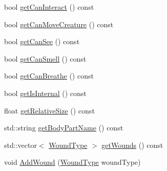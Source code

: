 \begin{DoxyCompactItemize}
\item 
bool \mbox{\hyperlink{class_body_part_a9a53de5a283928eb78986c3195d0f1b9}{get\+Can\+Interact}} () const
\item 
bool \mbox{\hyperlink{class_body_part_a77da57c41bc2b7bde4f35d13298224ca}{get\+Can\+Move\+Creature}} () const
\item 
bool \mbox{\hyperlink{class_body_part_ab1a17aec7b3aa4d388fb9c8421cdc519}{get\+Can\+See}} () const
\item 
bool \mbox{\hyperlink{class_body_part_a9a954b18bd4bee1a8a2dea9d3464fd29}{get\+Can\+Smell}} () const
\item 
bool \mbox{\hyperlink{class_body_part_a9bbc06713cb6b2d0c6c978e5b307d85b}{get\+Can\+Breathe}} () const
\item 
bool \mbox{\hyperlink{class_body_part_a9a7b684a14febfb06d1c5abfdc99ed89}{get\+Is\+Internal}} () const
\item 
float \mbox{\hyperlink{class_body_part_a195def981a8f414a0456c9dfb2a70c0d}{get\+Relative\+Size}} () const
\item 
std\+::string \mbox{\hyperlink{class_body_part_af5a68e571235e6b4e8cd6a13ec94bab3}{get\+Body\+Part\+Name}} () const
\item 
std\+::vector$<$ \mbox{\hyperlink{_enum_types_8hpp_a585daaeecd1f9f1350c24bf0081a734e}{Wound\+Type}} $>$ \mbox{\hyperlink{class_body_part_a14b7007a9ddb15b7e3f5c6881dbf69d5}{get\+Wounds}} () const
\item 
void \mbox{\hyperlink{class_body_part_a796eab925725be8a3bba686958677789}{Add\+Wound}} (\mbox{\hyperlink{_enum_types_8hpp_a585daaeecd1f9f1350c24bf0081a734e}{Wound\+Type}} wound\+Type)
\end{DoxyCompactItemize}
